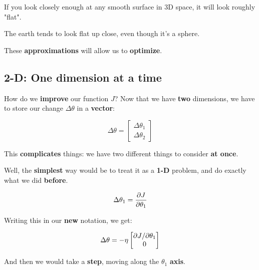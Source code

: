         If you look closely enough at any smooth surface in 3D space, it will look roughly "flat".

        \miniex The earth tends to look flat up close, even though it's a sphere.
        
        These \textbf{approximations} will allow us to \textbf{optimize}.

    \subsection{2-D: One dimension at a time}
        
        How do we \textbf{improve} our function $J$? Now that we have \textbf{two} dimensions, we have to store our change $\Delta \theta$ in a \textbf{vector}:
        
        \begin{equation}
            \Delta \theta
            =
            \begin{bmatrix}
                  \Delta \theta_1 \\ \Delta \theta_2 
            \end{bmatrix}
        \end{equation}
        
        This \textbf{complicates} things: we have two different things to consider \textbf{at once}.
        
        Well, the \textbf{simplest} way would be to treat it as a \textbf{1-D} problem, and do exactly what we did \textbf{before}. 
        
        \begin{equation}
            \Delta \theta_1 = \frac{\partial J}{\partial \theta_1}
        \end{equation}
        
        Writing this in our \textbf{new} notation, we get:
        
        \begin{equation}
            \Delta \theta
            =
            - \eta 
            \begin{bmatrix}
                  {\partial J}/{\partial \theta_1} \\ 0 
            \end{bmatrix}
        \end{equation}
        
        And then we would take a \textbf{step}, moving along the $\theta_1$ \textbf{axis}.
        
